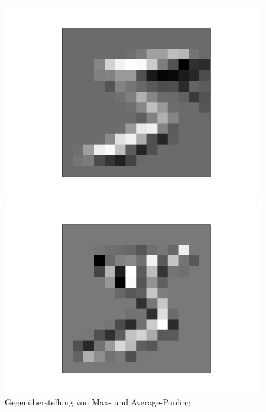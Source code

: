 \documentclass[11pt]{article}
\begin{document}
\begin{figure}[h]
\begin{minipage}{0.2\linewidth}
	\includegraphics[width=\linewidth]{../graphics/mnist_5/conv_pool/lower_horiz_avgpooled.png}
\end{minipage}
\hfill
\begin{minipage}{0.2\linewidth}
	\centering
	\includegraphics[width=\linewidth]{../graphics/mnist_5/conv_pool/right_vert_avgpooled.png}
\end{minipage}
\caption{Gegenüberstellung von Max- und Average-Pooling}
\label{Pooling_Mnist}
\end{figure}
\\
\end{document}
